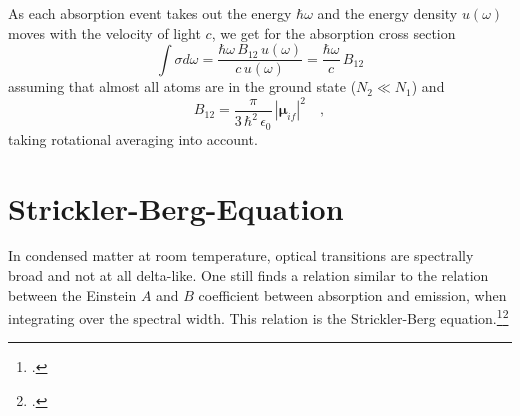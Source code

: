  As each absorption event takes out the energy $\hbar \omega$ and the energy density $u(\omega)$ moves with the velocity of light $c$, we get for the absorption cross section
\begin{equation}
\int \sigma d \omega = \frac{\hbar \omega \, B_{12} \, u(\omega)  }{c \, u(\omega) }  =
   \frac{\hbar \omega  }{c  }    \, B_{12}
\end{equation}
assuming that almost all atoms are in the ground state ($N_2 \ll N_1$) and
\begin{equation}
B_{12} = \frac{\pi}{3 \, \hbar^2 \, \epsilon_0} \,  |\mathbf{\mu}_{if} |^2  \quad ,
\end{equation}
taking rotational averaging into account.




\section{Strickler-Berg-Equation} 


In condensed matter at room temperature, optical transitions are spectrally broad and not at all delta-like. One still finds a relation similar to the relation between the Einstein $A$ and $B$ coefficient between absorption and emission, when integrating over the spectral width. This relation is the  Strickler-Berg equation.\footcite[chapter 5.3][]{Strickler_Berg, Parson}\footcite[chapter 
1.4.3.2]{KoehlerBaessler2015}


